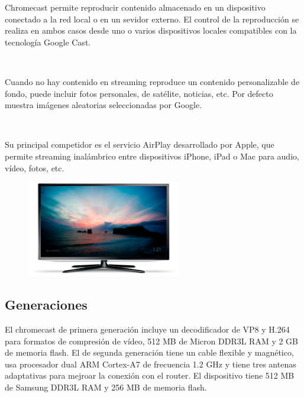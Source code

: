 Chromecast permite reproducir contenido almacenado en un dispositivo conectado a la red local o en un sevidor externo. El control de la reproducción se realiza en ambos casos desde uno o varios dispositivos locales compatibles con la tecnología Google Cast.

\

Cuando no hay contenido en streaming reproduce un contenido personalizable de fondo, puede incluir fotos personales,
de satélite, noticias, etc. Por defecto muestra imágenes aleatorias seleccionadas por Google.

\

Su principal competidor es el servicio AirPlay desarrollado por Apple, que permite streaming inalámbrico entre dispositivos iPhone, iPad o Mac para audio, vídeo, fotos, etc.

\vspace{1cm}
\begin{figure}[h]
	\centering
	\includegraphics[width=0.6\textwidth]{./Imagenes/fondo.png}
	\label{fig:fondo}
\end{figure}

\newpage


\subsection{Generaciones}

El chromecast de primera generación incluye un decodificador de VP8 y H.264 para formatos de compresión de vídeo, 512 MB de Micron DDR3L RAM y 2 GB de memoria flash.
El de segunda generación tiene un cable flexible y magnético, usa procesador dual ARM Cortex-A7 de frecuencia 1.2 GHz y tiene tres antenas adaptativas para mejroar la conexión con el router.
El dispositivo tiene 512 MB de Samsung DDR3L RAM y 256 MB de memoria flash.

